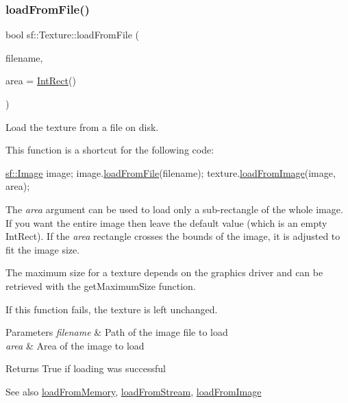 \subsubsection{\texorpdfstring{load\+From\+File()}{loadFromFile()}}
{\footnotesize\ttfamily bool sf\+::\+Texture\+::load\+From\+File (\begin{DoxyParamCaption}\item[{const std\+::string \&}]{filename,  }\item[{const \hyperlink{classsf_1_1_rect}{Int\+Rect} \&}]{area = {\ttfamily \hyperlink{classsf_1_1_rect}{Int\+Rect}()} }\end{DoxyParamCaption})}



Load the texture from a file on disk. 

This function is a shortcut for the following code\+: 
\begin{DoxyCode}
\hyperlink{classsf_1_1_image}{sf::Image} image;
image.\hyperlink{classsf_1_1_image_a9e4f2aa8e36d0cabde5ed5a4ef80290b}{loadFromFile}(filename);
texture.\hyperlink{classsf_1_1_texture_abec4567ad9856a3596dc74803f26fba2}{loadFromImage}(image, area);
\end{DoxyCode}


The {\itshape area} argument can be used to load only a sub-\/rectangle of the whole image. If you want the entire image then leave the default value (which is an empty Int\+Rect). If the {\itshape area} rectangle crosses the bounds of the image, it is adjusted to fit the image size.

The maximum size for a texture depends on the graphics driver and can be retrieved with the get\+Maximum\+Size function.

If this function fails, the texture is left unchanged.


\begin{DoxyParams}{Parameters}
{\em filename} & Path of the image file to load \\
\hline
{\em area} & Area of the image to load\\
\hline
\end{DoxyParams}
\begin{DoxyReturn}{Returns}
True if loading was successful
\end{DoxyReturn}
\begin{DoxySeeAlso}{See also}
\hyperlink{classsf_1_1_texture_a2c4adb19dd4cbee0a588eeb85e52a249}{load\+From\+Memory}, \hyperlink{classsf_1_1_texture_a786b486a46b1c6d1c16ff4af61ecc601}{load\+From\+Stream}, \hyperlink{classsf_1_1_texture_abec4567ad9856a3596dc74803f26fba2}{load\+From\+Image} 
\end{DoxySeeAlso}
\mbox{\label{classsf_1_1_texture_abec4567ad9856a3596dc74803f26fba2}} 
